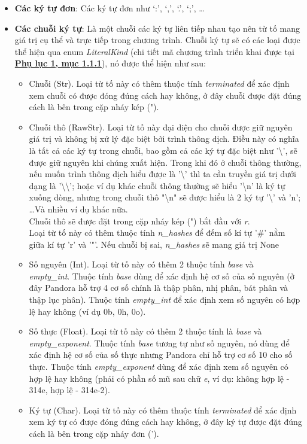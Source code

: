 \begin{itemize}
  \item \textbf{Các ký tự đơn}: Các ký tự đơn như `:', `,', `.', `;', \dots
  \item \textbf{Các chuỗi ký tự}:
    Là một chuỗi các ký tự liên tiếp nhau tạo nên từ tố mang giá trị cụ thể và trực tiếp trong chương trình. Chuỗi ký tự sẽ có các loại được thể hiện qua enum \textit{LiteralKind} (chi tiết mã chương trình triển khai được tại \hyperref[ap1:simple_token_literal]{\bf Phụ lục 1, mục 1.1.1}), nó được thể hiện như sau:
    \begin{itemize}
      \item Chuỗi (Str). Loại từ tố này có thêm thuộc tính \textit{terminated} để xác định xem chuỗi có được đóng đúng cách hay không, ở đây chuỗi được đặt đúng cách là bên trong cặp nháy kép (").
      \item Chuỗi thô (RawStr). Loại từ tố này đại diện cho chuỗi được giữ nguyên giá trị và không bị xử lý đặc biệt bởi trình thông dịch. Điều này có nghĩa là tất cả các ký tự trong chuỗi, bao gồm cả các ký tự đặc biệt như '\textbackslash', sẽ được giữ nguyên khi chúng xuất hiện. Trong khi đó ở chuỗi thông thường, nếu muốn trình thông dịch hiểu được là '\textbackslash' thì ta cần truyền giá trị dưới dạng là '\textbackslash\textbackslash'; hoặc ví dụ khác chuỗi thông thường sẽ hiểu '\textbackslash n' là ký tự xuống dòng, nhưng trong chuỗi thô "\textbackslash n" sẽ được hiểu là 2 ký tự '\textbackslash' và 'n'; \dots\space Và nhiều ví dụ khác nữa. 
      \\Chuỗi thô sẽ được đặt trong cặp nháy kép (") bắt đầu với \textit{r}.
      \\Loại từ tố này có thêm thuộc tính \textit{n\_hashes} để đếm số kí tự '\#' nằm giữa kí tự 'r' và '"'. Nếu chuỗi bị sai, \textit{n\_hashes} sẽ mang giá trị None
      \item Số nguyên (Int). Loại từ tố này có thêm 2 thuộc tính \textit{base} và \\\textit{empty\_int}. Thuộc tính \textit{base} dùng để xác định hệ cơ số của số nguyên (ở đây Pandora hỗ trợ 4 cơ số chính là thập phân, nhị phân, bát phân và thập lục phân). Thuộc tính \textit{empty\_int} để xác định xem số nguyên có hợp lệ hay không (ví dụ 0b, 0h, 0o).
      \item Số thực (Float). Loại từ tố này có thêm 2 thuộc tính là \textit{base} và \\\textit{empty\_exponent}. Thuộc tính \textit{base} tương tự như số nguyên, nó dùng để xác định hệ cơ số của số thực nhưng Pandora chỉ hỗ trợ cơ số 10 cho số thực. Thuộc tính \textit{empty\_exponent} dùng để xác định xem số nguyên có hợp lệ hay không (phải có phần số mũ sau chữ \textit{e}, ví dụ: không hợp lệ - 314e, hợp lệ - 314e-2).
      \item Ký tự (Char). Loại từ tố này có thêm thuộc tính \textit{terminated} để xác định xem ký tự có được đóng đúng cách hay không, ở đây ký tự được đặt đúng cách là bên trong cặp nháy đơn (').
      

\end{itemize}
\end{itemize}
